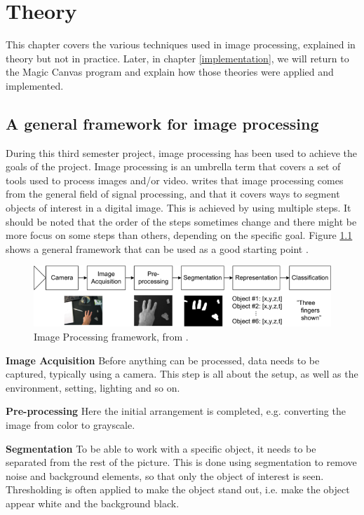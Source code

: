 \chapter{Theory}\label{theory_part}
This chapter covers the various techniques used in image processing, explained in theory but not in practice. Later, in chapter \ref{implementation}, we will return to the Magic Canvas program and explain how those theories were applied and implemented.

\section{A general framework for image processing}
During this third semester project, image processing has been used to achieve the goals of the project.
Image processing is an umbrella term that covers a set of tools used to process images and/or video. \citep{ip_book} writes that image processing comes from the general field of signal processing, and that it covers ways to segment objects of interest in a digital image. This is achieved by using multiple steps. It should be noted that the order of the steps sometimes change and there might be more focus on some steps than others, depending on the specific goal. Figure \ref{fig:ip_framework} shows a general framework that can be used as a good starting point \citep{ip_book}.

\begin{figure}[htbp]
\centering
\includegraphics[width=1.00\textwidth]{Pictures/Theory/imageProcessing_steps.png}
\caption{Image Processing framework, from \citep{ip_book}.}
\label{fig:ip_framework}
\end{figure}

\textbf{Image Acquisition}
Before anything can be processed, data needs to be captured, typically using a camera. This step is all about the setup, as well as the environment, setting, lighting and so on.

\textbf{Pre-processing}
Here the initial arrangement is completed, e.g. converting the image from color to grayscale.

\textbf{Segmentation}
To be able to work with a specific object, it needs to be separated from the rest of the picture. This is done using segmentation to remove noise and background elements, so that only the object of interest is seen. Thresholding is often applied to make the object stand out, i.e. make the object appear white and the background black.

